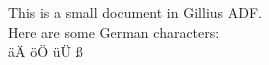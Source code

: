 \documentclass{article}
\begin{document}
This is a small document in Gillius ADF.
\\
Here are some German characters:
\\
äÄ öÖ üÜ ß
\end{document}
